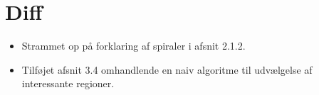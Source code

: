 {
\section*{Diff}
\begin{itemize}
	\item Strammet op på forklaring af spiraler i afsnit 2.1.2.
	\item Tilføjet afsnit 3.4 omhandlende en naiv algoritme til
		udvælgelse af interessante regioner.
\end{itemize}

}

